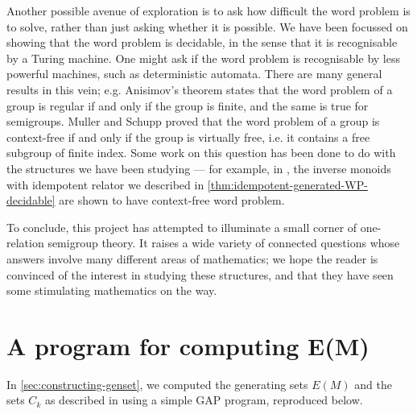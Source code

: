 \documentclass[noindex,noinsetproof,12pt]{lmaths}
\begin{document}
Another possible avenue of exploration is to ask how difficult the word problem is to solve, rather than just asking whether it is possible. We have been focussed on showing that the word problem is decidable, in the sense that it is recognisable by a Turing machine. One might ask if the word problem is recognisable by less powerful machines, such as deterministic automata. There are many general results in this vein; e.g. Anisimov's theorem states that the word problem of a group is regular if and only if the group is finite, and the same is true for semigroups. Muller and Schupp proved that the word problem of a group is context-free if and only if the group is virtually free, i.e. it contains a free subgroup of finite index. Some work on this question has been done to do with the structures we have been studying --- for example, in \cite{Margolis1993}, the inverse monoids with idempotent relator we described in \cref{thm:idempotent-generated-WP-decidable} are shown to have context-free word problem.

To conclude, this project has attempted to illuminate a small corner of one-relation semigroup theory. It raises a wide variety of connected questions whose answers involve many different areas of mathematics; we hope the reader is convinced of the interest in studying these structures, and that they have seen some stimulating mathematics on the way.


\appendix
\section{A program for computing \texorpdfstring{E(M)}{$E(M)$}} \label{sec:E(M)-program}

In \cref{sec:constructing-genset}, we computed the generating sets $E(M)$ and the sets $C_k$ as described in \cite{Zhang1992a} using a simple GAP program, reproduced below.

\inputminted[linenos=true,mathescape,tabsize=2,breaklines]{gap}{../ors.g}
\clearpage

\printbibliography

\printindex
\end{document}
